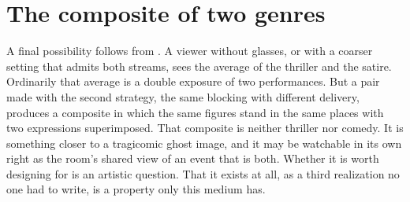 \section{The composite of two genres}

A final possibility follows from . A viewer without glasses, or with a coarser setting that admits both streams, sees the average of the thriller and the satire. Ordinarily that average is a double exposure of two performances. But a pair made with the second strategy, the same blocking with different delivery, produces a composite in which the same figures stand in the same places with two expressions superimposed. That composite is neither thriller nor comedy. It is something closer to a tragicomic ghost image, and it may be watchable in its own right as the room's shared view of an event that is both. Whether it is worth designing for is an artistic question. That it exists at all, as a third realization no one had to write, is a property only this medium has.
